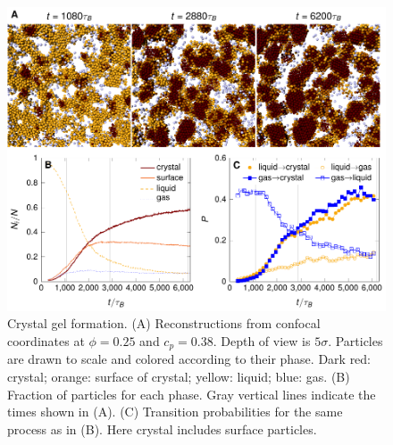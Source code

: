 \documentclass[12pt]{article}
\begin{document}
\clearpage 

\begin{figure}
 \centering
 \includegraphics{crystal}
 \caption{
Crystal gel formation.  
(A) Reconstructions from confocal coordinates at $\phi=0.25$ and $c_p=0.38$. Depth of view is $5\sigma$. Particles are drawn to scale and colored according to their phase. Dark red: crystal; orange: surface of crystal; yellow: liquid; blue: gas. 
(B) Fraction of particles for each phase. Gray vertical lines indicate the times shown in (A). 
(C) Transition probabilities for the same process as in (B). Here crystal includes surface particles.}
\label{fig:transitions}
\end{figure}
\end{document}
